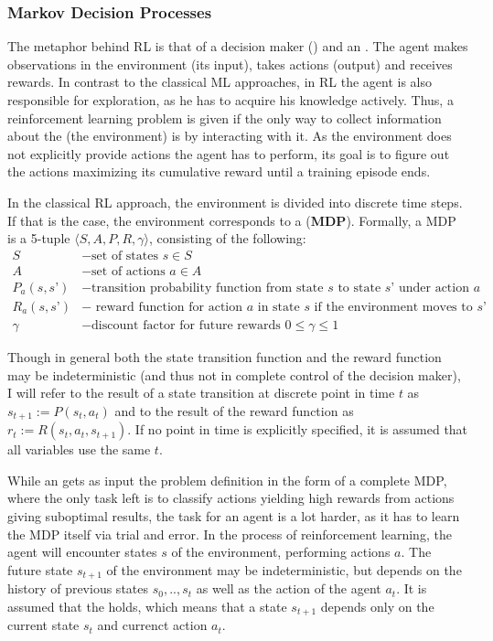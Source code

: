 \subsubsection{Markov Decision Processes}

The metaphor behind RL is that of a decision maker () and an . The agent makes observations in the environment (its input), takes actions (output) and receives rewards. In contrast to the classical ML approaches, in RL the agent is also responsible for exploration, as he has to acquire his knowledge actively. Thus, a reinforcement learning problem is given if the only way to collect information about the  (the environment) is by interacting with it. As the environment does not explicitly provide actions the agent has to perform, its goal is to figure out the actions maximizing its cumulative reward until a training episode ends.

In the classical RL approach, the environment is divided into discrete time steps. If that is the case, the environment corresponds to a  (\textbf{MDP}). Formally, a MDP is a 5-tuple $\langle S, A, P, R, \gamma \rangle$, consisting of the following:\\
\begin{align*}
S &- \text{set of states } s\in S\\
A &- \text{set of actions } a \in A\\
P_a(s, s’) &- \text{transition probability function from state } s \text{ to state } s’ \text{ under action } a\\
R_a(s, s’) &- \text{ reward function for action } a \text{ in state } s \text{ if the environment moves to } s’\\
\gamma &- \text{discount factor for future rewards } 0 \leq \gamma \leq 1
\end{align*}

Though in general both the state transition function and the reward function may be indeterministic (and thus not in complete control of the decision maker), I will refer to the result of a state transition at discrete point in time $t$ as $s_{t+1} := P(s_t,a_t)$ and to the result of the reward function as $r_t := R(s_t,a_t,s_{t+1})$. If no point in time is explicitly specified, it is assumed that all variables use the same $t$.

While an  gets as input the problem definition in the form of a complete MDP, where the only task left is to classify actions yielding high rewards from actions giving suboptimal results, the task for an  agent is a lot harder, as it has to learn the MDP itself via trial and error. In the process of reinforcement learning, the agent will encounter states $s$ of the environment, performing actions $a$. The future state $s_{t+1}$ of the environment may be indeterministic, but depends on the history of previous states $s_0, .., s_t$ as well as the action of the agent $a_t$. It is assumed that the  holds, which means that a state  $s_{t+1}$ depends only on the current state $s_t$ and currenct action $a_t$.

